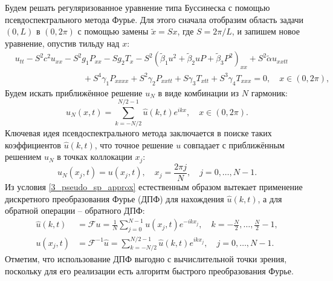 \documentclass[12pt, a4paper]{report}
\begin{document}
Будем решать регуляризованное уравнение типа Буссинеска с помощью псевдоспектрального метода Фурье. Для этого сначала отобразим область задачи $(0, L)$ в $(0, 2\pi)$ с помощью замены $\tilde x = Sx$, где $S = 2\pi/L$, и запишем новое уравнение, опустив тильду над $x$:
\begin{equation}
\label{3_bq_reg_scaled}
\begin{split}
&u_{tt} - S^2 c^2 u_{xx} - S^2 g_1 P_{xx} - S g_2 T_x - S^2\left(\tilde{\beta}_1 u^2 + \tilde{\beta}_2 u P + \tilde{\beta}_3 P^2\right)_{xx} + S^2\tilde\alpha u_{xxtt}\\
&\qquad\qquad\qquad\qquad + S^4\gamma_1 P_{xxxx} + S^2\gamma_2 P_{xxtt} + S\gamma_3 T_{xtt} + S^3\gamma_4 T_{xxx} = 0, \quad x\in(0, 2\pi),
\end{split}
\end{equation}
Будем искать приближённое решение $u_N$ в виде комбинации из $N$ гармоник:
\begin{equation}\label{3_spect_approx}
u_N(x, t) = \sum_{k=-N/2}^{N/2-1} \widehat u(k, t) e^{ikx}, \quad x\in(0, 2\pi).
\end{equation}
Ключевая идея псевдоспектрального метода заключается в поиске таких коэффициентов $\widehat u(k, t)$, что точное решение $u$ совпадает с приближённым решением $u_N$ в точках коллокации $x_j$:
\begin{equation}\label{3_pseudo_sp_approx}
u_N(x_j, t) = u(x_j, t), \quad x_j = \frac{2\pi j}{N}, \quad j=0,\dots, N-1.
\end{equation}
Из условия \eqref{3_pseudo_sp_approx} естественным образом вытекает применение дискретного преобразования Фурье (ДПФ) для нахождения $\widehat u(k, t)$, а для обратной операции -- обратного ДПФ:
\begin{align}\label{3_dft}
\widehat u(k, t) &= \mathcal{F} u = \frac1N\sum_{j=0}^{N-1} u(x_j, t) e^{-ikx_j}, \quad k=-\frac N 2, \dots, \frac N 2 - 1,\\
\label{3_idft}
u(x_j, t) &= \mathcal{F}^{-1} \widehat u = \sum_{k=-N/2}^{N/2-1} \widehat u(k, t) e^{ikx_j}, \quad j=0, \dots, N-1.
\end{align}
Отметим, что использование ДПФ выгодно с вычислительной точки зрения, поскольку для его реализации есть алгоритм быстрого преобразования Фурье.
\end{document}
